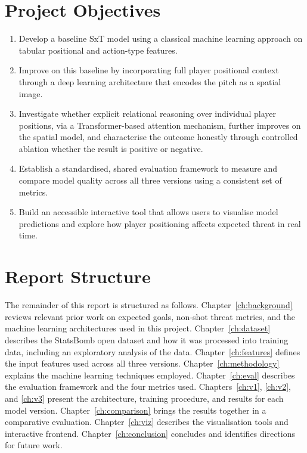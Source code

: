 \section{Project Objectives}
\begin{enumerate}
    \item Develop a baseline SxT model using a classical machine learning approach on tabular positional and action-type features.
    \item Improve on this baseline by incorporating full player positional context through a deep learning architecture that encodes the pitch as a spatial image.
    \item Investigate whether explicit relational reasoning over individual player positions, via a Transformer-based attention mechanism, further improves on the spatial model, and characterise the outcome honestly through controlled ablation whether the result is positive or negative.
    \item Establish a standardised, shared evaluation framework to measure and compare model quality across all three versions using a consistent set of metrics.
    \item Build an accessible interactive tool that allows users to visualise model predictions and explore how player positioning affects expected threat in real time.
\end{enumerate}

\section{Report Structure}
The remainder of this report is structured as follows. Chapter~\ref{ch:background} reviews relevant prior work on expected goals, non-shot threat metrics, and the machine learning architectures used in this project. Chapter~\ref{ch:dataset} describes the StatsBomb open dataset and how it was processed into training data, including an exploratory analysis of the data. Chapter~\ref{ch:features} defines the input features used across all three versions. Chapter~\ref{ch:methodology} explains the machine learning techniques employed. Chapter~\ref{ch:eval} describes the evaluation framework and the four metrics used. Chapters~\ref{ch:v1}, \ref{ch:v2}, and \ref{ch:v3} present the architecture, training procedure, and results for each model version. Chapter~\ref{ch:comparison} brings the results together in a comparative evaluation. Chapter~\ref{ch:viz} describes the visualisation tools and interactive frontend. Chapter~\ref{ch:conclusion} concludes and identifies directions for future work.
